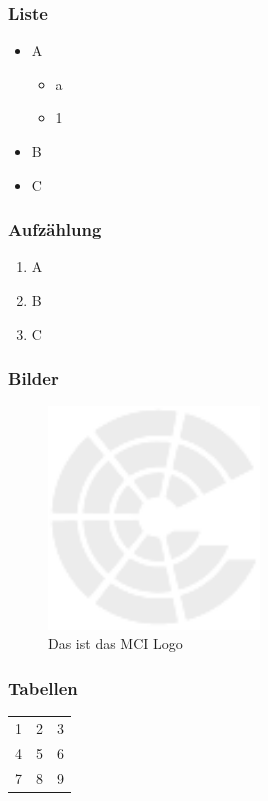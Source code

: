 \documentclass[a4paper, ngerman, oneside, 10pt]{article}
\begin{document}
\subsubsection{Liste}
\begin{itemize}
	\item A
	      \begin{itemize}
		      \item a
		      \item 1
	      \end{itemize}
	\item B
	\item C
\end{itemize}

\subsubsection{Aufzählung}
\begin{enumerate}
	\item A
	\item B
	\item C
\end{enumerate}

\subsubsection{Bilder}
\begin{figure}[H]
	\centering
	\includegraphics[width=0.5\textwidth]{images/MCI_Logo.pdf}
	\caption[MCI-Logo]{Das ist das MCI Logo}
	\label{fig:mci_logo}
\end{figure}


\subsubsection{Tabellen}
\begin{tabular}{lcr}
	1 & 2 & 3 \\
	4 & 5 & 6 \\
	7 & 8 & 9 \\
\end{tabular}
\end{document}
